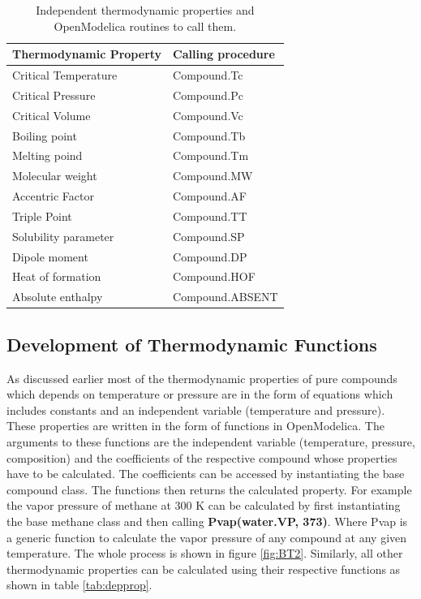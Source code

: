 \documentclass[12pt]{report}
\begin{document}
\begin{table}
\centering
\caption {Independent thermodynamic properties and OpenModelica routines to call them.}
\label{tab:indprop}
\vspace{1ex}
\begin{tabular}{l|l} \hline
Thermodynamic Property & Calling procedure \\ \hline
Critical Temperature & Compound.Tc \\
Critical Pressure & Compound.Pc \\
Critical Volume & Compound.Vc \\
Boiling point & Compound.Tb \\
Melting poind & Compound.Tm \\
Molecular weight & Compound.MW \\
Accentric Factor & Compound.AF \\
Triple Point & Compound.TT \\
Solubility parameter & Compound.SP \\ 
Dipole moment & Compound.DP \\ 
Heat of formation & Compound.HOF \\ 
Absolute enthalpy & Compound.ABSENT \\ \hline
\end{tabular}
\end{table}

\subsection{Development of Thermodynamic Functions}

As discussed earlier most of the thermodynamic properties of pure compounds which depends on temperature or pressure are in the form of equations which includes constants and an independent variable (temperature and pressure). These properties are written in the form of functions in OpenModelica. The arguments to these functions are the independent variable (temperature, pressure, composition) and the coefficients of the respective compound whose properties have to be calculated. The coefficients can be accessed by instantiating the base compound class. The functions then returns the calculated property. For example the vapor pressure of methane at 300 K can be calculated by first instantiating the base methane class and then calling \textbf{Pvap(water.VP, 373)}. Where Pvap is a generic function to calculate the vapor pressure of any compound at any given temperature. The whole process is shown in figure \ref{fig:BT2}. Similarly, all other thermodynamic properties can be calculated using their respective functions as shown in table \ref{tab:depprop}.
\end{document}
